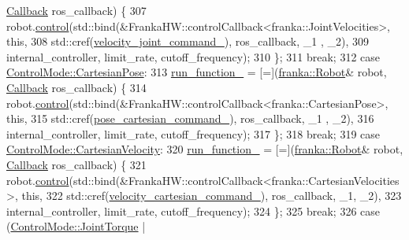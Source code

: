 \begin{DoxyCode}
      \hyperlink{classfranka__hw_1_1FrankaHW_ac576bd5140a03864888c68519daa5aa4}{Callback} ros\_callback) \{
307         robot.\hyperlink{classfranka_1_1Robot_a5b5ba0a4f2bfd20be963b05622e629e1}{control}(std::bind(&FrankaHW::controlCallback<franka::JointVelocities>, \textcolor{keyword}{this},
308                                 std::cref(\hyperlink{classfranka__hw_1_1FrankaHW_ae25ff898759d1f0c9a34c873cadd8e01}{velocity\_joint\_command\_}), ros\_callback, \_1
      , \_2),
309                       internal\_controller, limit\_rate, cutoff\_frequency);
310       \};
311       \textcolor{keywordflow}{break};
312     \textcolor{keywordflow}{case} \hyperlink{namespacefranka__hw_afa416558ce4baace5ac6c71bd5d2c98cab5a449319cc586903a8995a0b463df50}{ControlMode::CartesianPose}:
313       \hyperlink{classfranka__hw_1_1FrankaHW_ab53d17aecdb62936defdcde99e9b88b8}{run\_function\_} = [=](\hyperlink{classfranka_1_1Robot}{franka::Robot}& robot, 
      \hyperlink{classfranka__hw_1_1FrankaHW_ac576bd5140a03864888c68519daa5aa4}{Callback} ros\_callback) \{
314         robot.\hyperlink{classfranka_1_1Robot_a5b5ba0a4f2bfd20be963b05622e629e1}{control}(std::bind(&FrankaHW::controlCallback<franka::CartesianPose>, \textcolor{keyword}{this},
315                                 std::cref(\hyperlink{classfranka__hw_1_1FrankaHW_a28885bdd6202f0efbe793725e5d2497b}{pose\_cartesian\_command\_}), ros\_callback, \_1
      , \_2),
316                       internal\_controller, limit\_rate, cutoff\_frequency);
317       \};
318       \textcolor{keywordflow}{break};
319     \textcolor{keywordflow}{case} \hyperlink{namespacefranka__hw_afa416558ce4baace5ac6c71bd5d2c98ca5f4d2e0f06b2be984d61e898b354da1e}{ControlMode::CartesianVelocity}:
320       \hyperlink{classfranka__hw_1_1FrankaHW_ab53d17aecdb62936defdcde99e9b88b8}{run\_function\_} = [=](\hyperlink{classfranka_1_1Robot}{franka::Robot}& robot, 
      \hyperlink{classfranka__hw_1_1FrankaHW_ac576bd5140a03864888c68519daa5aa4}{Callback} ros\_callback) \{
321         robot.\hyperlink{classfranka_1_1Robot_a5b5ba0a4f2bfd20be963b05622e629e1}{control}(std::bind(&FrankaHW::controlCallback<franka::CartesianVelocities>, \textcolor{keyword}{this},
322                                 std::cref(\hyperlink{classfranka__hw_1_1FrankaHW_aaa601f471de0a83874ba1f9de038eb30}{velocity\_cartesian\_command\_}), 
      ros\_callback, \_1, \_2),
323                       internal\_controller, limit\_rate, cutoff\_frequency);
324       \};
325       \textcolor{keywordflow}{break};
326     \textcolor{keywordflow}{case} (\hyperlink{namespacefranka__hw_afa416558ce4baace5ac6c71bd5d2c98ca6c640e0814bb12aecaa28d237d393467}{ControlMode::JointTorque} | 

\end{DoxyCode}
